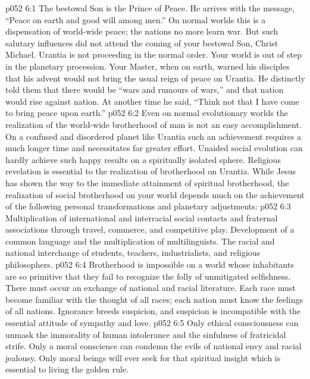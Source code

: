 \vs p052 6:1 The bestowal Son is the Prince of Peace. He arrives with the message, “Peace on earth and good will among men.” On normal worlds this is a dispensation of world\hyp{}wide peace; the nations no more learn war. But such salutary influences did not attend the coming of your bestowal Son, Christ Michael. Urantia is not proceeding in the normal order. Your world is out of step in the planetary procession. Your Master, when on earth, warned his disciples that his advent would not bring the usual reign of peace on Urantia. He distinctly told them that there would be “wars and rumours of wars,” and that nation would rise against nation. At another time he said, “Think not that I have come to bring peace upon earth.”
\vs p052 6:2 Even on normal evolutionary worlds the realization of the world\hyp{}wide brotherhood of man is not an easy accomplishment. On a confused and disordered planet like Urantia such an achievement requires a much longer time and necessitates far greater effort. Unaided social evolution can hardly achieve such happy results on a spiritually isolated sphere. Religious revelation is essential to the realization of brotherhood on Urantia. While Jesus has shown the way to the immediate attainment of spiritual brotherhood, the realization of social brotherhood on your world depends much on the achievement of the following personal transformations and planetary adjustments:
\vs p052 6:3 \bibnobreakspace {} Multiplication of international and interracial social contacts and fraternal associations through travel, commerce, and competitive play. Development of a common language and the multiplication of multilinguists. The racial and national interchange of students, teachers, industrialists, and religious philosophers.
\vs p052 6:4 \bibnobreakspace {} Brotherhood is impossible on a world whose inhabitants are so primitive that they fail to recognize the folly of unmitigated selfishness. There must occur an exchange of national and racial literature. Each race must become familiar with the thought of all races; each nation must know the feelings of all nations. Ignorance breeds suspicion, and suspicion is incompatible with the essential attitude of sympathy and love.
\vs p052 6:5 \bibnobreakspace {} Only ethical consciousness can unmask the immorality of human intolerance and the sinfulness of fratricidal strife. Only a moral conscience can condemn the evils of national envy and racial jealousy. Only moral beings will ever seek for that spiritual insight which is essential to living the golden rule.
